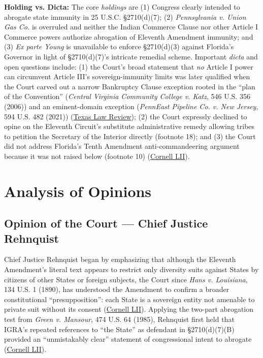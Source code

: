 \documentclass[12pt]{article}
\begin{document}
\textbf{Holding vs. Dicta:} The core \textit{holdings} are (1) Congress clearly intended to abrogate state immunity in 25 U.S.C. \S 2710(d)(7); (2) \textit{Pennsylvania v. Union Gas Co.} is overruled and neither the Indian Commerce Clause nor other Article I Commerce powers authorize abrogation of Eleventh Amendment immunity; and (3) \textit{Ex parte Young} is unavailable to enforce \S 2710(d)(3) against Florida's Governor in light of \S 2710(d)(7)'s intricate remedial scheme. Important \textit{dicta} and open questions include: (1) the Court's broad statement that \textit{no} Article I power can circumvent Article III's sovereign-immunity limits was later qualified when the Court carved out a narrow Bankruptcy Clause exception rooted in the ``plan of the Convention'' (\textit{Central Virginia Community College v. Katz}, 546 U.S. 356 (2006)) and an eminent-domain exception (\textit{PennEast Pipeline Co. v. New Jersey}, 594 U.S. 482 (2021)) (\href{https://texaslawreview.org/state-sovereign-immunity-after-the-revolution/}{Texas Law Review}); (2) the Court expressly declined to opine on the Eleventh Circuit's substitute administrative remedy allowing tribes to petition the Secretary of the Interior directly (footnote 18); and (3) the Court did not address Florida's Tenth Amendment anti-commandeering argument because it was not raised below (footnote 10) (\href{https://www.law.cornell.edu/supct/html/94-12.ZO.html}{Cornell LII}).

\section{Analysis of Opinions}

\subsection{Opinion of the Court --- Chief Justice Rehnquist}

Chief Justice Rehnquist began by emphasizing that although the Eleventh Amendment's literal text appears to restrict only diversity suits against States by citizens of other States or foreign subjects, the Court since \textit{Hans v. Louisiana}, 134 U.S. 1 (1890), has understood the Amendment to confirm a broader constitutional ``presupposition'': each State is a sovereign entity not amenable to private suit without its consent (\href{https://www.law.cornell.edu/supct/html/94-12.ZO.html}{Cornell LII}). Applying the two-part abrogation test from \textit{Green v. Mansour}, 474 U.S. 64 (1985), Rehnquist first held that IGRA's repeated references to ``the State'' as defendant in \S 2710(d)(7)(B) provided an ``unmistakably clear'' statement of congressional intent to abrogate (\href{https://www.law.cornell.edu/supct/html/94-12.ZO.html}{Cornell LII}).
\end{document}
